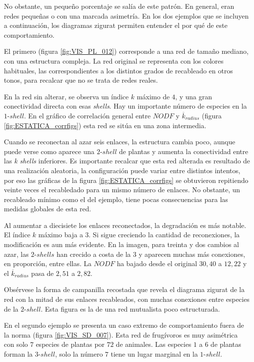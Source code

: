 No obstante, un pequeño porcentaje se salía de este patrón. En general, eran redes pequeñas o con una marcada asimetría. En los dos ejemplos que se incluyen a continuación, los diagramas zigurat permiten entender el por qué de este comportamiento.

El primero (figura \ref{fig:VIS_PL_012}) corresponde a una red de tamaño mediano, con una estructura compleja. La red original se representa con los colores habituales, las correspondientes a los distintos grados de recableado en otros tonos, para recalcar que no se trata de redes reales. 

En la red sin alterar, se observa un índice $k$ máximo de $4$, y una gran conectividad directa con esas \textit{shells}. Hay un importante número de especies en la $1$-$shell$. En el gráfico de correlación general entre $NODF$ y $\overline k_{radius}$ (figura \ref{fig:ESTATICA_corrfigs}) esta red se sitúa en una zona intermedia.

Cuando se reconectan al azar seis enlaces, la estructura cambia poco, aunque puede verse como aparece una $2$-$shell$ de plantas y aumenta la conectividad entre las \textit{k shells} inferiores. Es importante recalcar que esta red alterada es resultado de una realización aleatoria, la configuración puede variar entre distintos intentos, por eso las gráficas de la figura \ref{fig:ESTATICA_corrfigs} se obtuvieron repitiendo veinte veces el recabledado para un mismo número de enlaces. No obstante, un recableado mínimo como el del ejemplo, tiene pocas consecuencias para las medidas globales de esta red.

Al aumentar a diecisiete los enlaces reconectados, la degradación es más notable. El índice $k$ máximo baja a $3$. Si sigue creciendo la cantidad de reconexiones, la modificación es aun más evidente. En la imagen, para treinta y dos cambios al azar, las $2$-$shells$ han crecido a costa de la $3$ y aparecen muchas más conexiones, en proporción, entre ellas. La $NODF$ ha bajado desde el original $30,40$ a $12,22$ y el $\overline k_{radius}$ pasa de $2,51$ a $2,82$.

Obsérvese la forma de campanilla recostada que revela el diagrama zigurat de la red con la mitad de sus enlaces recableados, con  muchas conexiones entre especies de la $2$-$shell$. Esta figura es la de una red mutualista poco estructurada.

En el segundo ejemplo se presenta un caso extremo de comportamiento fuera de la norma  (figura \ref{fig:VIS_SD_007}). Esta red de frugívoros es muy asimétrica con solo $7$ especies de plantas por $72$ de animales. Las especies $1$ a $6$ de plantas forman la $3$-$shell$, solo la número $7$ tiene un lugar marginal en la $1$-$shell$.

